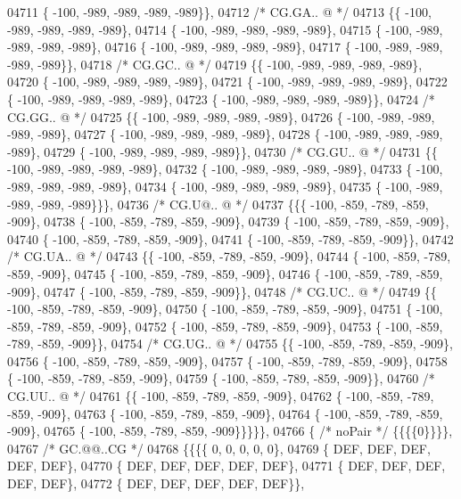 \begin{DoxyCode}
04711 \{ -100, -989, -989, -989, -989\}\},
04712 \textcolor{comment}{/* CG.GA.. @ */}
04713 \{\{ -100, -989, -989, -989, -989\},
04714 \{ -100, -989, -989, -989, -989\},
04715 \{ -100, -989, -989, -989, -989\},
04716 \{ -100, -989, -989, -989, -989\},
04717 \{ -100, -989, -989, -989, -989\}\},
04718 \textcolor{comment}{/* CG.GC.. @ */}
04719 \{\{ -100, -989, -989, -989, -989\},
04720 \{ -100, -989, -989, -989, -989\},
04721 \{ -100, -989, -989, -989, -989\},
04722 \{ -100, -989, -989, -989, -989\},
04723 \{ -100, -989, -989, -989, -989\}\},
04724 \textcolor{comment}{/* CG.GG.. @ */}
04725 \{\{ -100, -989, -989, -989, -989\},
04726 \{ -100, -989, -989, -989, -989\},
04727 \{ -100, -989, -989, -989, -989\},
04728 \{ -100, -989, -989, -989, -989\},
04729 \{ -100, -989, -989, -989, -989\}\},
04730 \textcolor{comment}{/* CG.GU.. @ */}
04731 \{\{ -100, -989, -989, -989, -989\},
04732 \{ -100, -989, -989, -989, -989\},
04733 \{ -100, -989, -989, -989, -989\},
04734 \{ -100, -989, -989, -989, -989\},
04735 \{ -100, -989, -989, -989, -989\}\}\},
04736 \textcolor{comment}{/* CG.U@.. @ */}
04737 \{\{\{ -100, -859, -789, -859, -909\},
04738 \{ -100, -859, -789, -859, -909\},
04739 \{ -100, -859, -789, -859, -909\},
04740 \{ -100, -859, -789, -859, -909\},
04741 \{ -100, -859, -789, -859, -909\}\},
04742 \textcolor{comment}{/* CG.UA.. @ */}
04743 \{\{ -100, -859, -789, -859, -909\},
04744 \{ -100, -859, -789, -859, -909\},
04745 \{ -100, -859, -789, -859, -909\},
04746 \{ -100, -859, -789, -859, -909\},
04747 \{ -100, -859, -789, -859, -909\}\},
04748 \textcolor{comment}{/* CG.UC.. @ */}
04749 \{\{ -100, -859, -789, -859, -909\},
04750 \{ -100, -859, -789, -859, -909\},
04751 \{ -100, -859, -789, -859, -909\},
04752 \{ -100, -859, -789, -859, -909\},
04753 \{ -100, -859, -789, -859, -909\}\},
04754 \textcolor{comment}{/* CG.UG.. @ */}
04755 \{\{ -100, -859, -789, -859, -909\},
04756 \{ -100, -859, -789, -859, -909\},
04757 \{ -100, -859, -789, -859, -909\},
04758 \{ -100, -859, -789, -859, -909\},
04759 \{ -100, -859, -789, -859, -909\}\},
04760 \textcolor{comment}{/* CG.UU.. @ */}
04761 \{\{ -100, -859, -789, -859, -909\},
04762 \{ -100, -859, -789, -859, -909\},
04763 \{ -100, -859, -789, -859, -909\},
04764 \{ -100, -859, -789, -859, -909\},
04765 \{ -100, -859, -789, -859, -909\}\}\}\}\},
04766 \{ \textcolor{comment}{/* noPair */} \{\{\{\{0\}\}\}\},
04767 \textcolor{comment}{/* GC.@@..CG */}
04768 \{\{\{\{    0,    0,    0,    0,    0\},
04769 \{  DEF,  DEF,  DEF,  DEF,  DEF\},
04770 \{  DEF,  DEF,  DEF,  DEF,  DEF\},
04771 \{  DEF,  DEF,  DEF,  DEF,  DEF\},
04772 \{  DEF,  DEF,  DEF,  DEF,  DEF\}\},

\end{DoxyCode}
